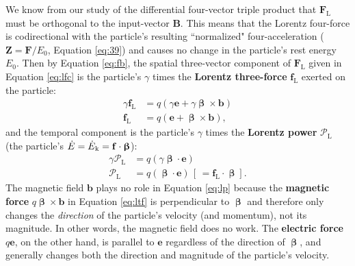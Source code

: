 \documentclass[12pt]{article}
\renewcommand{\vv}[1]{\mathbf{#1}}
\newcommand{\vvbeta}{\bm{\upbeta}}
\begin{document}
We know from our study of the differential four-vector triple product that $\vv F_{\mathrm{L}}$ must be orthogonal to the input-vector $\vv B$. This means that the Lorentz four-force is codirectional with the particle's resulting ``normalized" four-acceleration ($\vv Z =  \vv F / E_0$, Equation \ref{eq:39}) and causes no change in the particle's rest energy $E_0$. Then by Equation \ref{eq:fb}, the spatial three-vector component of $\vv F_{\textrm{L}}$ given in Equation \ref{eq:lfc} is the particle's $\gamma$ times the \textbf{Lorentz three-force} $\vv f_{\textrm{L}}$ exerted on the particle:
\begin{equation}\label{eq:ltf}
\begin{split}
\gamma \vv f_{\textrm{L}} &= q ( \gamma \vv e + \gamma \vvbeta \times \vv b ) \\
\vv f_{\textrm{L}} &= q ( \vv e + \vvbeta \times \vv b ),
\end{split}
\end{equation}
and the temporal component is the particle's $\gamma$ times the \textbf{Lorentz power} $\mathcal{P}_{\textrm{L}}$ (the particle's $\dot{E} = \dot{E}_{\mkern.5mu \textrm{k}} = \vv f \cdot \vvbeta$):
\begin{equation}\label{eq:lp}
\begin{split}
\gamma \mathcal{P}_{\textrm{L}} &= q ( \gamma \vvbeta \cdot \vv e ) \\
\mathcal{P}_{\textrm{L}} &= q ( \vvbeta \cdot \vv e ) \, \left[ \, = \vv f_{\textrm{L}} \cdot \vvbeta \right].
\end{split}
\end{equation}
The magnetic field $\vv b$ plays no role in Equation \ref{eq:lp} because the \textbf{magnetic force} $q \vvbeta \times \vv b$ in Equation \ref{eq:ltf} is perpendicular to $\vvbeta$ and therefore only changes the \emph{direction} of the particle's velocity (and momentum), not its magnitude. In other words, the magnetic field does no work. The \textbf{electric force} $q \vv e$, on the other hand, is parallel to $\vv e$ regardless of the direction of $\vvbeta$, and generally changes both the direction and magnitude of the particle's velocity.
\end{document}
